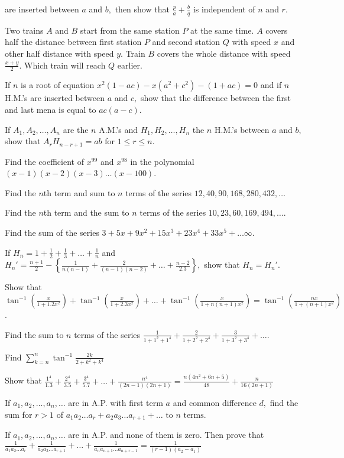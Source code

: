   are inserted between $a$ and $b,$ then show that $\frac{p}{a} + \frac{b}{q}$ is independent of $n$ and $r$.
\item Two trains $A$ and $B$ start from the same station $P$ at the same time. $A$ covers half the distance between first
  station $P$ and second station $Q$ with speed $x$ and other half distance with speed $y$. Train $B$ covers the whole distance
  with speed $\frac{x + y}{2}.$ Which train will reach $Q$ earlier.
\item If $n$ is a root of equation $x^2(1 - ac) - x(a^2+c^2) - (1 + ac) = 0$ and if $n$ H.M.'s are inserted between $a$
  and $c,$ show that the difference between the first and last mena is equal to $ac(a - c)$.
\item If $A_1, A_2, \ldots, A_n$ are the $n$ A.M.'s and $H_1, H_2, \ldots, H_n$ the $n$ H.M.'s between $a$ and $b,$ show
  that $A_rH_{n - r + 1} = ab$ for $1\leq r\leq n$.
\item Find the coefficient of $x^{99}$ and $x^{98}$ in the polynomial $(x - 1)(x - 2)(x - 3)\ldots(x - 100)$.
\item Find the $n$th term and sum to $n$ terms of the series $12, 40, 90, 168, 280, 432, \ldots$
\item Find the $n$th term and the sum to $n$ terms of the series $10, 23, 60, 169, 494, \ldots$.
\item Find the sum of the series $3 + 5x + 9x^2 + 15x^3 + 23x^4 + 33x^5 + \ldots \infty$.
\item If $H_n = 1 + \frac{1}{2} + \frac{1}{3} + \ldots + \frac{1}{n}$ and $H_n' = \frac{n + 1}{2} - \left\{\frac{1}{n(n - 1)}
  + \frac{2}{(n - 1)(n - 2)} + \ldots + \frac{n - 2}{2.3}\right\},$ show that $H_n = H_n'$.
\item Show that $\tan^{-1}\left(\frac{x}{1 + 1.2x^2}\right) + \tan^{-1}\left(\frac{x}{1 + 2.3x^2}\right) + \ldots+
  \tan^{-1}\left(\frac{x}{1 + n(n + 1)x^2}\right) = \tan^{-1}\left(\frac{nx}{1 + (n + 1)x^2}\right)$.
\item Find the sum to $n$ terms of the series $\frac{1}{1 + 1^2 + 1^4} + \frac{2}{1 + 2^2 + 2^4} + \frac{3}{1 + 3^2 +
  3^4} + \ldots$.
\item Find $\displaystyle\sum_{k=n}^n\tan^{-1}\frac{2k}{2 + k^2 + k^4}$
\item Show that $\frac{1^4}{1.3} + \frac{2^4}{3.5} + \frac{3^4}{5.7} + \ldots + \frac{n^4}{(2n - 1)(2n + 1)} =
  \frac{n(4n^2 + 6n + 5)}{48} + \frac{n}{16(2n + 1)}$
\item If $a_1, a_2, \ldots, a_n, \ldots$ are in A.P. with first term $a$ and common difference $d,$ find the sum for $r >
  1$ of $a_1a_2\ldots a_r + a_2a_3\ldots a_{r + 1} + \ldots \text{~to~}n\text{~terms}$.
\item If $a_1, a_2, \ldots, a_n, \ldots$ are in A.P. and none of them is zero. Then prove that $\frac{1}{a_1a_2\ldots
    a_r} + \frac{1}{a_2a_3\ldots a_{r + 1}} + \ldots + \frac{1}{a_na_{n + 1}\ldots a_{n + r - 1}} = \frac{1}{(r - 1)(a_2 -
  a_1)}$

